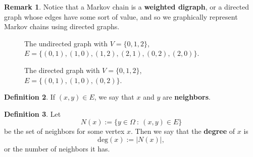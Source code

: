 \documentclass[10pt,a4paper]{amsart}
\theoremstyle{definition}
\newtheorem{definition}{Definition}
\numberwithin{definition}{section}
\newtheorem{remark}[definition]{Remark}
\begin{document}
\begin{remark}
Notice that a Markov chain is a \textbf{weighted digraph}, or a directed graph whose edges have some sort of value, and so we graphically represent Markov chains using directed graphs.
\end{remark}

\begin{figure}
\begin{center}
\end{center}
\caption{The undirected graph with $V = \{0,1,2\}$, $E = \{(0,1), (1,0), (1,2), (2,1), (0,2), (2,0)\}$.}
\label{fig:graph01}
\end{figure}


\begin{figure}

\begin{center}
\end{center}
\caption{The directed graph with $V = \{0,1,2\}$, $E = \{(0,1), (1,0), (0,2)\}$.}
\label{fig:graph0}
\end{figure}

\begin{definition}
If $(x,y) \in E$, we say that $x$ and $y$ are \textbf{neighbors}. 
\end{definition}

\begin{definition}
Let 
\[ N(x) := \{y \in \Omega \ : \ (x,y) \in E\} \]
be the set of neighbors for some vertex $x$. Then we say that the \textbf{degree} of $x$ is 
\[ \text{deg}(x) := |N(x)|,\]
or the number of neighbors it has.
\end{definition}
\end{document}
